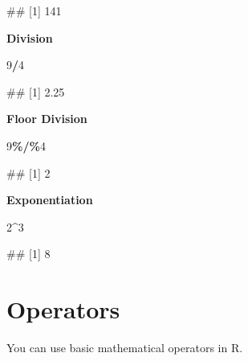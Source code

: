 \documentclass[
]{book}
\newenvironment{Shaded}{\begin{snugshade}}{\end{snugshade}}
\newcommand{\DecValTok}[1]{\textcolor[rgb]{0.00,0.00,0.81}{#1}}
\newcommand{\NormalTok}[1]{#1}
\newcommand{\SpecialCharTok}[1]{\textcolor[rgb]{0.81,0.36,0.00}{\textbf{#1}}}
\begin{document}
\begin{Shaded}
\begin{Highlighting}[]
\NormalTok{\#\# [1] 141}
\end{Highlighting}
\end{Shaded}

\textbf{Division}

\begin{Shaded}
\begin{Highlighting}[]
\DecValTok{9}\SpecialCharTok{/}\DecValTok{4}
\end{Highlighting}
\end{Shaded}

\begin{Shaded}
\begin{Highlighting}[]
\NormalTok{\#\# [1] 2.25}
\end{Highlighting}
\end{Shaded}

\textbf{Floor Division}

\begin{Shaded}
\begin{Highlighting}[]
\DecValTok{9}\SpecialCharTok{\%/\%}\DecValTok{4}
\end{Highlighting}
\end{Shaded}

\begin{Shaded}
\begin{Highlighting}[]
\NormalTok{\#\# [1] 2}
\end{Highlighting}
\end{Shaded}

\textbf{Exponentiation}

\begin{Shaded}
\begin{Highlighting}[]
\DecValTok{2}\SpecialCharTok{\^{}}\DecValTok{3}
\end{Highlighting}
\end{Shaded}

\begin{Shaded}
\begin{Highlighting}[]
\NormalTok{\#\# [1] 8}
\end{Highlighting}
\end{Shaded}

\section{Operators}\label{operators}

You can use basic mathematical operators in R.
\end{document}
